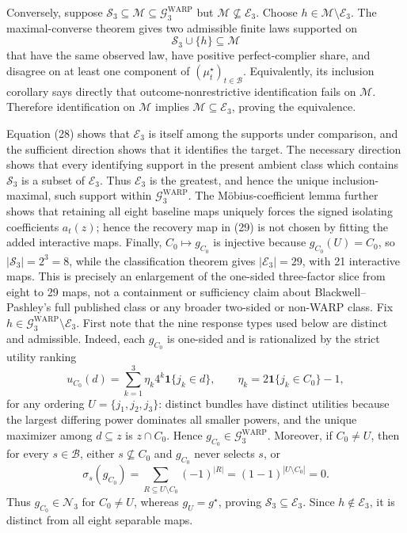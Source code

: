 Conversely, suppose \(\mathcal S_3\subseteq\mathcal M\subseteq\mathcal G^{\mathrm{WARP}}_3\) but \(\mathcal M\not\subseteq\mathcal E_3\).  Choose \(h\in\mathcal M\setminus\mathcal E_3\).  The maximal-converse theorem gives two admissible finite laws supported on
\[
\mathcal S_3\cup\{h\}\subseteq\mathcal M
\]
that have the same observed law, have positive perfect-complier share, and disagree on at least one component of \((\mu_t^\star)_{t\in\mathcal B}\).  Equivalently, its inclusion corollary says directly that outcome-nonrestrictive identification fails on \(\mathcal M\).  Therefore identification on \(\mathcal M\) implies \(\mathcal M\subseteq\mathcal E_3\), proving the equivalence.

Equation (28) shows that \(\mathcal E_3\) is itself among the supports under comparison, and the sufficient direction shows that it identifies the target.  The necessary direction shows that every identifying support in the present ambient class which contains \(\mathcal S_3\) is a subset of \(\mathcal E_3\).  Thus \(\mathcal E_3\) is the greatest, and hence the unique inclusion-maximal, such support within \(\mathcal G^{\mathrm{WARP}}_3\).  The Möbius-coefficient lemma further shows that retaining all eight baseline maps uniquely forces the signed isolating coefficients \(a_t(z)\); hence the recovery map in (29) is not chosen by fitting the added interactive maps.  Finally, \(C_0\mapsto g_{C_0}\) is injective because \(g_{C_0}(U)=C_0\), so \(|\mathcal S_3|=2^3=8\), while the classification theorem gives \(|\mathcal E_3|=29\), with 21 interactive maps.  This is precisely an enlargement of the one-sided three-factor slice from eight to 29 maps, not a containment or sufficiency claim about Blackwell--Pashley's full published class or any broader two-sided or non-WARP class.
Fix \(h\in\mathcal G^{\mathrm{WARP}}_3\setminus\mathcal E_3\).  First note that the nine response types used below are distinct and admissible.  Indeed, each \(g_{C_0}\) is one-sided and is rationalized by the strict utility ranking
\[
u_{C_0}(d)=\sum_{k=1}^3\eta_k4^k\mathbf 1\{j_k\in d\},
\qquad
\eta_k=2\mathbf 1\{j_k\in C_0\}-1,
\]
for any ordering \(U=\{j_1,j_2,j_3\}\): distinct bundles have distinct utilities because the largest differing power dominates all smaller powers, and the unique maximizer among \(d\subseteq z\) is \(z\cap C_0\).  Hence \(g_{C_0}\in\mathcal G^{\mathrm{WARP}}_3\).  Moreover, if \(C_0\ne U\), then for every \(s\in\mathcal B\), either \(s\not\subseteq C_0\) and \(g_{C_0}\) never selects \(s\), or
\[
\sigma_s(g_{C_0})
=\sum_{R\subseteq U\setminus C_0}(-1)^{|R|}
=(1-1)^{|U\setminus C_0|}=0.
\]
Thus \(g_{C_0}\in\mathcal N_3\) for \(C_0\ne U\), whereas \(g_U=g^\star\), proving \(\mathcal S_3\subseteq\mathcal E_3\).  Since \(h\notin\mathcal E_3\), it is distinct from all eight separable maps.


